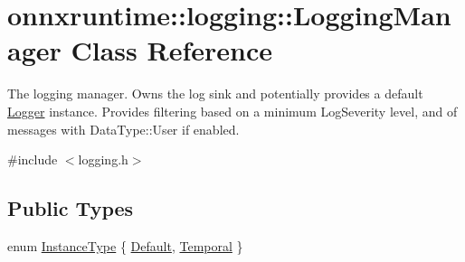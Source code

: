 \hypertarget{classonnxruntime_1_1logging_1_1LoggingManager}{}\section{onnxruntime\+:\+:logging\+:\+:Logging\+Manager Class Reference}
\label{classonnxruntime_1_1logging_1_1LoggingManager}


The logging manager. Owns the log sink and potentially provides a default \mbox{\hyperlink{classonnxruntime_1_1logging_1_1Logger}{Logger}} instance. Provides filtering based on a minimum Log\+Severity level, and of messages with Data\+Type\+::\+User if enabled.  




{\ttfamily \#include $<$logging.\+h$>$}

\subsection*{Public Types}
\begin{DoxyCompactItemize}
\item 
enum \mbox{\hyperlink{classonnxruntime_1_1logging_1_1LoggingManager_af3489102aaa98cc9b30fcd5ac641eef6}{Instance\+Type}} \{ \mbox{\hyperlink{classonnxruntime_1_1logging_1_1LoggingManager_af3489102aaa98cc9b30fcd5ac641eef6aab6fc5ca706a53bb18ccc29b6dfe70e7}{Default}}, 
\mbox{\hyperlink{classonnxruntime_1_1logging_1_1LoggingManager_af3489102aaa98cc9b30fcd5ac641eef6a26960a6b2a2ae9f3bef95fbd07f0b072}{Temporal}}
 \}
\end{DoxyCompactItemize}
